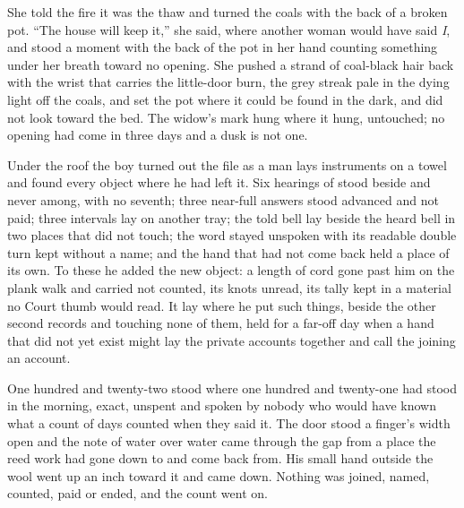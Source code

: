 She told the fire it was the thaw and turned the coals with the back of a broken pot. “The house will keep it,” she said, where another woman would have said \emph{I}, and stood a moment with the back of the pot in her hand counting something under her breath toward no opening. She pushed a strand of coal-black hair back with the wrist that carries the little-door burn, the grey streak pale in the dying light off the coals, and set the pot where it could be found in the dark, and did not look toward the bed. The widow's mark hung where it hung, untouched; no opening had come in three days and a dusk is not one.

Under the roof the boy turned out the file as a man lays instruments on a towel and found every object where he had left it. Six hearings of  stood beside and never among, with no seventh; three near-full answers stood advanced and not paid; three intervals lay on another tray; the told bell lay beside the heard bell in two places that did not touch; the word stayed unspoken with its readable double turn kept without a name; and the hand that had not come back held a place of its own. To these he added the new object: a length of cord gone past him on the plank walk and carried not counted, its knots unread, its tally kept in a material no Court thumb would read. It lay where he put such things, beside the other second records and touching none of them, held for a far-off day when a hand that did not yet exist might lay the private accounts together and call the joining an account.

One hundred and twenty-two stood where one hundred and twenty-one had stood in the morning, exact, unspent and spoken by nobody who would have known what a count of days counted when they said it. The door stood a finger's width open and the note of water over water came through the gap from a place the reed work had gone down to and come back from. His small hand outside the wool went up an inch toward it and came down. Nothing was joined, named, counted, paid or ended, and the count went on.
